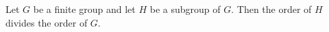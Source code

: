 \documentclass[12pt]{article}
\begin{document}
Let $G$ be a finite group and let $H$ be a subgroup of $G$.  Then the order of $H$ divides the order of $G$.
\end{document}
